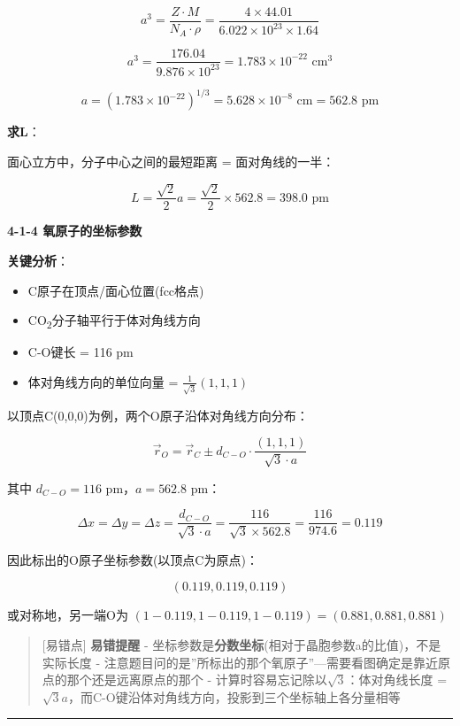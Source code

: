 \documentclass[a4paper,11pt]{ctexart}
\providecommand{\tightlist}{\setlength{\itemsep}{0pt}\setlength{\parskip}{0pt}}
\newcommand{\箭}{\ensuremath{\rightarrow}}
\newcommand{\左箭}{\ensuremath{\leftarrow}}
\newcommand{\上箭}{\ensuremath{\uparrow}}
\newcommand{\下箭}{\ensuremath{\downarrow}}
\newcommand{\衡}{\ensuremath{\rightleftharpoons}}
\newcommand{\双箭}{\ensuremath{\leftrightarrow}}
\newcommand{\约等于}{\ensuremath{\approx}}
\newcommand{\小于等于}{\ensuremath{\leq}}
\newcommand{\大于等于}{\ensuremath{\geq}}
\newcommand{\不等于}{\ensuremath{\neq}}
\newcommand{\西格马}{\ensuremath{\sigma}}
\newcommand{\派}{\ensuremath{\pi}}
\begin{document}
\[a^3 = \frac{Z \cdot M}{N_A \cdot \rho} = \frac{4 \times 44.01}{6.022 \times 10^{23} \times 1.64}\]

\[a^3 = \frac{176.04}{9.876 \times 10^{23}} = 1.783 \times 10^{-22} \text{ cm}^3\]

\[a = (1.783 \times 10^{-22})^{1/3} = 5.628 \times 10^{-8} \text{ cm} = 562.8 \text{ pm}\]

\textbf{求L}：

面心立方中，分子中心之间的最短距离 = 面对角线的一半：

\[L = \frac{\sqrt{2}}{2}a = \frac{\sqrt{2}}{2} \times 562.8 = 398.0 \text{ pm}\]

\textbf{4-1-4 氧原子的坐标参数}

\textbf{关键分析}：

\begin{itemize}
\tightlist
\item
  C原子在顶点/面心位置(fcc格点)
\item
  CO\textsubscript{2}分子轴平行于体对角线方向
\item
  C-O键长 = 116 pm
\item
  体对角线方向的单位向量 = \(\frac{1}{\sqrt{3}}(1,1,1)\)
\end{itemize}

以顶点C(0,0,0)为例，两个O原子沿体对角线方向分布：

\[\vec{r}_O = \vec{r}_C \pm d_{C-O} \cdot \frac{(1,1,1)}{\sqrt{3} \cdot a}\]

其中 \(d_{C-O} = 116\) pm，\(a = 562.8\) pm：

\[\Delta x = \Delta y = \Delta z = \frac{d_{C-O}}{\sqrt{3} \cdot a} = \frac{116}{\sqrt{3} \times 562.8} = \frac{116}{974.6} = 0.119\]

因此标出的O原子坐标参数(以顶点C为原点)：

\[\boxed{(0.119, 0.119, 0.119)}\]

或对称地，另一端O为 \((1-0.119, 1-0.119, 1-0.119) = (0.881, 0.881, 0.881)\)

\begin{quote}
{[}易错点{]} \textbf{易错提醒}
- 坐标参数是\textbf{分数坐标}(相对于晶胞参数a的比值)，不是实际长度
- 注意题目问的是''所标出的那个氧原子''---需要看图确定是靠近原点的那个还是远离原点的那个
- 计算时容易忘记除以\(\sqrt{3}\)：体对角线长度 = \(\sqrt{3}a\)，而C-O键沿体对角线方向，投影到三个坐标轴上各分量相等
\end{quote}

\begin{center}\rule{0.5\linewidth}{0.5pt}\end{center}
\end{document}
